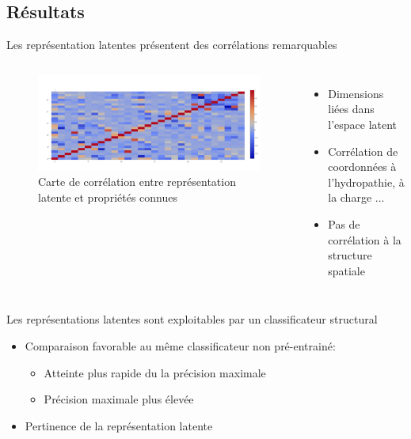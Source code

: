 \documentclass{beamer}
\begin{document}
\subsection{Résultats}

\begin{frame}{Les représentation latentes présentent des corrélations remarquables}

  \begin{columns}
    \begin{figure}
      \centering
      \includegraphics[scale=0.1650]{../Figures/SingleOneRecHeat}
      \caption{Carte de corrélation entre représentation latente et propriétés connues}
    \end{figure}

    \begin{itemize}
    \item Dimensions liées dans l'espace latent\pause
    \item Corrélation de coordonnées à l'hydropathie, à la charge ...\pause
    \item Pas de corrélation à la structure spatiale\pause
    \end{itemize}
  \end{columns}

\end{frame}

\begin{frame}{Les représentations latentes sont exploitables par un
    classificateur structural}

    \begin{itemize}
     
    \item Comparaison favorable au même classificateur non pré-entrainé:
      \begin{itemize}
      \item Atteinte plus rapide du la précision maximale\pause
      \item Précision maximale plus élevée\pause
      \end{itemize}
    \item Pertinence de la représentation latente\pause
    \end{itemize}

 \end{frame}
\end{document}
